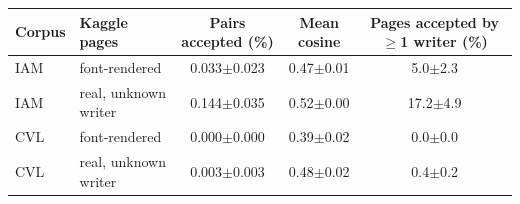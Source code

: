 \begin{tabular}{llccc}
\toprule
Corpus & Kaggle pages & Pairs accepted (\%) & Mean cosine & Pages accepted by $\geq$1 writer (\%) \\
\midrule
IAM & font-rendered & 0.033$\pm$0.023 & 0.47$\pm$0.01 & 5.0$\pm$2.3 \\
IAM & real, unknown writer & 0.144$\pm$0.035 & 0.52$\pm$0.00 & 17.2$\pm$4.9 \\
CVL & font-rendered & 0.000$\pm$0.000 & 0.39$\pm$0.02 & 0.0$\pm$0.0 \\
CVL & real, unknown writer & 0.003$\pm$0.003 & 0.48$\pm$0.02 & 0.4$\pm$0.2 \\
\bottomrule
\end{tabular}
